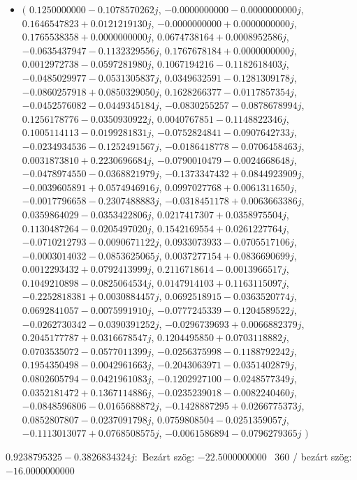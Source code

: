 \documentclass[14pt,a4paper]{article}
\begin{document}
\begin{itemize}
\item
$\big($
$0.1250000000-0.1078570262j$, $-0.0000000000-0.0000000000j$, $0.1646547823+0.0121219130j$, $-0.0000000000+0.0000000000j$, $0.1765538358+0.0000000000j$, $0.0674738164+0.0008952586j$, $-0.0635437947-0.1132329556j$, $0.1767678184+0.0000000000j$, $0.0012972738-0.0597281980j$, $0.1067194216-0.1182618403j$, $-0.0485029977-0.0531305837j$, $0.0349632591-0.1281309178j$, $-0.0860257918+0.0850329050j$, $0.1628266377-0.0117857354j$, $-0.0452576082-0.0449345184j$, $-0.0830255257-0.0878678994j$, $0.1256178776-0.0350930922j$, $0.0040767851-0.1148822346j$, $0.1005114113-0.0199281831j$, $-0.0752824841-0.0907642733j$, $-0.0234934536-0.1252491567j$, $-0.0186418778-0.0706458463j$, $0.0031873810+0.2230696684j$, $-0.0790010479-0.0024668648j$, $-0.0478974550-0.0368821979j$, $-0.1373347432+0.0844923909j$, $-0.0039605891+0.0574946916j$, $0.0997027768+0.0061311650j$, $-0.0017796658-0.2307488883j$, $-0.0318451178+0.0063663386j$, $0.0359864029-0.0353422806j$, $0.0217417307+0.0358975504j$, $0.1130487264-0.0205497020j$, $0.1542169554+0.0261227764j$, $-0.0710212793-0.0090671122j$, $0.0933073933-0.0705517106j$, $-0.0003014032-0.0853625065j$, $0.0037277154+0.0836690699j$, $0.0012293432+0.0792413999j$, $0.2116718614-0.0013966517j$, $0.1049210898-0.0825064534j$, $0.0147914103+0.1163115097j$, $-0.2252818381+0.0030884457j$, $0.0692518915-0.0363520774j$, $0.0692841057-0.0075991910j$, $-0.0777245339-0.1204589522j$, $-0.0262730342-0.0390391252j$, $-0.0296739693+0.0066882379j$, $0.2045177787+0.0316678547j$, $0.1204495850+0.0703118882j$, $0.0703535072-0.0577011399j$, $-0.0256375998-0.1188792242j$, $0.1954350498-0.0042961663j$, $-0.2043063971-0.0351402879j$, $0.0802605794-0.0421961083j$, $-0.1202927100-0.0248577349j$, $0.0352181472+0.1367114886j$, $-0.0235239018-0.0082240460j$, $-0.0848596806-0.0165688872j$, $-0.1428887295+0.0266775373j$, $0.0852807807-0.0237091798j$, $0.0759808504-0.0251359057j$, $-0.1113013077+0.0768508575j$, $-0.0061586894-0.0796279365j$
$\big)$
\end{itemize}
$0.9238795325-0.3826834324j$:\
Bezárt szög: $-22.5000000000$ \
360 / bezárt szög: $-16.0000000000$\
\end{document}
